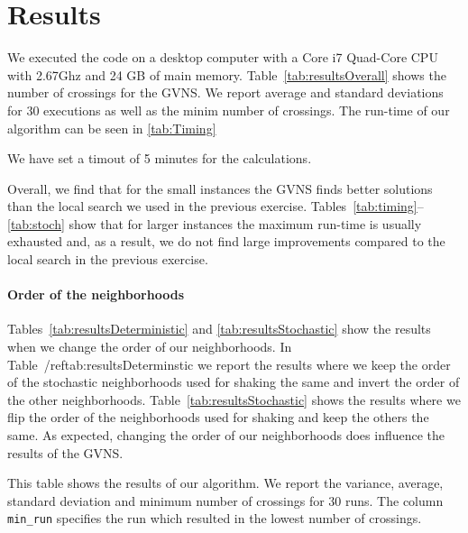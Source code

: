 \documentclass{scrartcl}
\begin{document}
\section{Results}

We executed the code on a desktop computer with a Core i7 Quad-Core
CPU with 2.67Ghz and 24 GB of main
memory. Table~\ref{tab:resultsOverall} shows the number of crossings
for the GVNS. We report average and standard deviations for $30$
executions as well as the minim number of crossings. The run-time of
our algorithm can be seen in \ref{tab:Timing}

We have set a timout of 5 minutes for the calculations.

Overall, we find that for the small instances the GVNS finds better
solutions than the local search we used in the previous
exercise. Tables~\ref{tab:timing}--\ref{tab:stoch} show that for
larger instances the maximum run-time is usually exhausted and, as a
result, we do not find large improvements compared to the local search
in the previous exercise.





\paragraph{Order of the neighborhoods}
Tables~\ref{tab:resultsDeterministic} and \ref{tab:resultsStochastic}
show the results when we change the order of our neighborhoods. In
Table~/ref{tab:resultsDeterminstic} we report the results where we
keep the order of the stochastic neighborhoods used for shaking the
same and invert the order of the other
neighborhoods. Table~\ref{tab:resultsStochastic} shows the results
where we flip the order of the neighborhoods used for shaking and keep
the others the same. As expected, changing the order of our
neighborhoods does influence the results of the GVNS.










\begin{table}[H]
  \centering
  \scriptsize
  
\caption{This table shows the results of our algorithm. We report the variance, average, standard deviation
  and minimum number of crossings for $30$ runs. The column \texttt{min\_run} specifies the run which resulted
  in the lowest number of crossings.}
\label{tab:resultsOverall}
\end{table}
\end{document}
